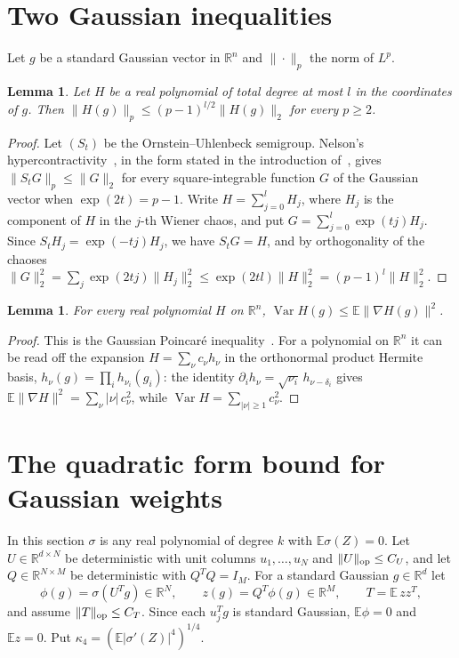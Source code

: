 \documentclass[11pt]{amsart}
\newtheorem{lemma}[theorem]{Lemma}
\theoremstyle{remark}
\numberwithin{equation}{section}
\newcommand{\EE}{\mathbb{E}}
\newcommand{\RR}{\mathbb{R}}
\DeclareMathOperator{\Var}{Var}
\begin{document}
\section{Two Gaussian inequalities}\label{sec:gauss}
Let $g$ be a standard Gaussian vector in $\RR^{n}$ and $\|\cdot\|_p$ the norm of $L^p$.

\begin{lemma}\label{lem:hyper}
Let $H$ be a real polynomial of total degree at most $l$ in the coordinates of $g$. Then $\|H(g)\|_p\le(p-1)^{l/2}\|H(g)\|_2$ for every $p\ge2$.
\end{lemma}

\begin{proof}
Let $(S_t)$ be the Ornstein--Uhlenbeck semigroup. Nelson's hypercontractivity~\cite{Nelson}, in the form stated in the introduction of~\cite{Hariya}, gives $\|S_tG\|_p\le\|G\|_2$ for every square-integrable function $G$ of the Gaussian vector when $\exp(2t)=p-1$. Write $H=\sum_{j=0}^{l}H_j$, where $H_j$ is the component of $H$ in the $j$-th Wiener chaos, and put $G=\sum_{j=0}^{l}\exp(tj)H_j$. Since $S_tH_j=\exp(-tj)H_j$, we have $S_tG=H$, and by orthogonality of the chaoses $\|G\|_2^2=\sum_j\exp(2tj)\|H_j\|_2^2\le\exp(2tl)\|H\|_2^2=(p-1)^{l}\|H\|_2^2$.
\end{proof}

\begin{lemma}\label{lem:poincare}
For every real polynomial $H$ on $\RR^n$, $\Var H(g)\le\EE\|\nabla H(g)\|^2$.
\end{lemma}

\begin{proof}
This is the Gaussian Poincar\'e inequality~\cite{Chernoff}. For a polynomial on $\RR^n$ it can be read off the expansion $H=\sum_\nu c_\nu h_\nu$ in the orthonormal product Hermite basis, $h_\nu(g)=\prod_ih_{\nu_i}(g_i)$: the identity $\partial_ih_\nu=\sqrt{\nu_i}\,h_{\nu-\delta_i}$ gives $\EE\|\nabla H\|^2=\sum_\nu|\nu|\,c_\nu^2$, while $\Var H=\sum_{|\nu|\ge1}c_\nu^2$.
\end{proof}

\section{The quadratic form bound for Gaussian weights}\label{sec:qf}
In this section $\sigma$ is any real polynomial of degree $k$ with $\EE\sigma(Z)=0$. Let $U\in\RR^{d\times N}$ be deterministic with unit columns $u_1,\dots,u_N$ and $\|U\|_{\rm op}\le C_U$, and let $Q\in\RR^{N\times M}$ be deterministic with $Q^{T}Q=I_M$. For a standard Gaussian $g\in\RR^{d}$ let
\[
\phi(g)=\sigma(U^{T}g)\in\RR^N,\qquad z(g)=Q^{T}\phi(g)\in\RR^{M},\qquad T=\EE\,zz^{T},
\]
and assume $\|T\|_{\rm op}\le C_T$. Since each $u_j^{T}g$ is standard Gaussian, $\EE\phi=0$ and $\EE z=0$. Put $\kappa_4=(\EE|\sigma'(Z)|^4)^{1/4}$.
\end{document}
